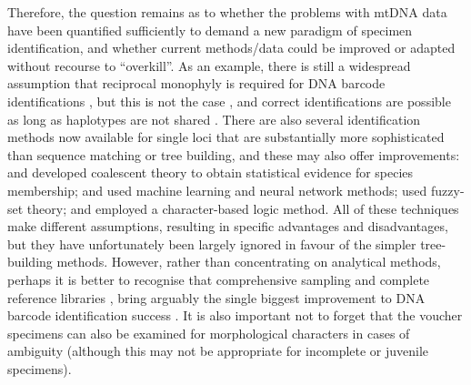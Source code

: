 \documentclass[12pt]{article}
\begin{document}
Therefore, the question remains as to whether the problems with mtDNA data have been quantified sufficiently to demand a new paradigm of specimen identification, and whether current methods/data could be improved or adapted without recourse to ``overkill''. As an example, there is still a widespread assumption that reciprocal monophyly is required for DNA barcode identifications \citep{Goldstein2011}, but this is not the case \citep{Meier2008}, and correct identifications are possible as long as haplotypes are not shared \citep{Meier2006}. There are also several identification methods now available for single loci that are substantially more sophisticated than sequence matching or tree building, and these may also offer improvements: \citet{Nielsen2006} and \citet{Abdo2007} developed coalescent theory to obtain statistical evidence for species membership; \citet{Zhang2008} and \citet{Zhang2012a} used machine learning and neural network methods; \citet{Zhang2012b} used fuzzy-set theory; and \citet{Weitschek2013} employed a character-based logic method. All of these techniques make different assumptions, resulting in specific advantages and disadvantages, but they have unfortunately been largely ignored in favour of the simpler tree-building methods. However, rather than concentrating on analytical methods, perhaps it is better to recognise that comprehensive sampling and complete reference libraries \citep{Boykin2012,Virgilio2012}, bring arguably the single biggest improvement to DNA barcode identification success \citep{Ekrem2007}. It is also important not to forget that the  voucher specimens can also be examined for morphological characters in cases of ambiguity (although this may not be appropriate for incomplete or juvenile specimens).
\end{document}
